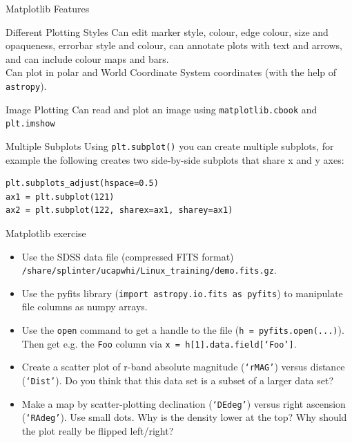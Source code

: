 \documentclass{beamer}
\begin{document}
\begin{frame}[fragile]{Matplotlib Features}
  \fontsize{11pt}{11}\selectfont
  \begin{block}{Different Plotting Styles}
     Can edit marker style, colour, edge colour, size and opaqueness, errorbar style and colour, can annotate plots with text and arrows, and can include colour maps and bars. \\
     Can plot in polar and World Coordinate System coordinates (with the help of \texttt{astropy}).
  \end{block}
  \begin{block}{Image Plotting}
     Can read and plot an image using \texttt{matplotlib.cbook} and \texttt{plt.imshow}
  \end{block}
  \begin{block}{Multiple Subplots}
     Using \texttt{plt.subplot()} you can create multiple subplots, for example the following creates two side-by-side subplots that share x and y axes:\\
     \begin{lstlisting}
plt.subplots_adjust(hspace=0.5)
ax1 = plt.subplot(121)
ax2 = plt.subplot(122, sharex=ax1, sharey=ax1)
     \end{lstlisting}
  \end{block}
\end{frame}


\begin{frame}{Matplotlib exercise}

  \begin{itemize}

  \item Use the SDSS data file (compressed FITS format) \texttt{/share/splinter/ucapwhi/Linux\_training/demo.fits.gz}.
  
  \item Use the pyfits library (\texttt{import astropy.io.fits as pyfits}) to manipulate file columns as numpy arrays.
  
  \item Use the \texttt{open} command to get a handle to the file (\texttt{h = pyfits.open(...)}). Then get e.g. the \texttt{Foo} column via \texttt{x = h[1].data.field[`Foo']}.
  
  \item Create a scatter plot of r-band absolute magnitude (\texttt{`rMAG'}) versus distance (\texttt{`Dist'}). Do you think that this data set is a subset of a larger data set?
  
  \item Make a map by scatter-plotting declination (\texttt{`DEdeg'}) versus right ascension (\texttt{`RAdeg'}). Use small dots. Why is the density lower at the top? Why should the plot really be flipped left/right?
  
  \end{itemize}

\end{frame}
\end{document}
